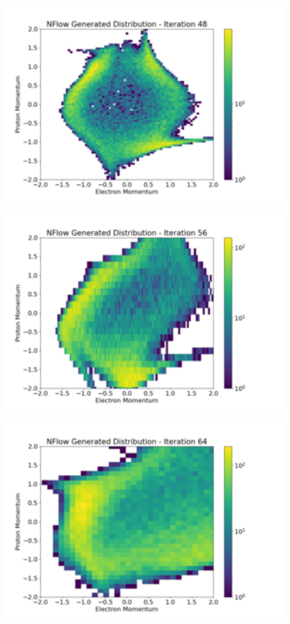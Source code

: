 \documentclass[aspectratio=169]{beamer}
\begin{document}
\begin{frame}[noframenumbering]\centering\includegraphics[width=0.8\textwidth]{images/400training/400training-6.png}\end{frame}
\begin{frame}[noframenumbering]\centering\includegraphics[width=0.8\textwidth]{images/400training/400training-7.png}\end{frame}
\begin{frame}[noframenumbering]\centering\includegraphics[width=0.8\textwidth]{images/400training/400training-8.png}\end{frame}
\end{document}
